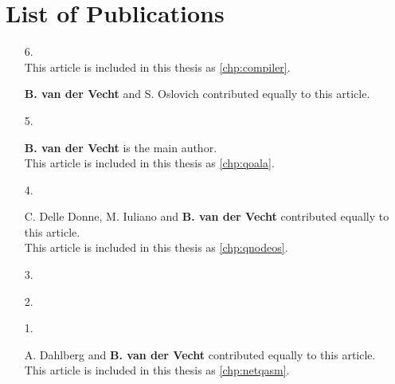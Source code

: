 \chapter*{List of Publications}

\def\aicon{\makebox[1.25em][l]{\footnotesize \faUser}}
\def\ficon{\makebox[1.25em][l]{\footnotesize \faFileTextO}}
\def\picon{\makebox[1.25em][l]{\footnotesize \faPencilSquareO}}

\begin{enumerate}[label={\arabic*.},itemsep=0.7\baselineskip,parsep=0.3\baselineskip]
    \item[6.] 
        \\ \ficon This article is included in this thesis as \cref{chp:compiler}.
        \par\aicon \textbf{B. van der Vecht} and S. Oslovich contributed equally to this article.
    \item[5.] 
        \par\aicon \textbf{B. van der Vecht} is the main author.
        \\ \ficon This article is included in this thesis as \cref{chp:qoala}. 
    \item[4.]  
        \par\aicon C. Delle Donne, M. Iuliano and \textbf{B. van der Vecht} contributed equally to this article.
        \\ \ficon This article is included in this thesis as \cref{chp:qnodeos}.
    \item[3.] 
    \item[2.]  
    \item[1.] 
        \par\aicon A. Dahlberg and \textbf{B. van der Vecht} contributed equally to this article.
        \\ \ficon This article is included in this thesis as \cref{chp:netqasm}.
\end{enumerate}

\begin{xstretch}
\printbibliography[heading=subbibintoc,title={References},notcategory=noprint]
\end{xstretch}

